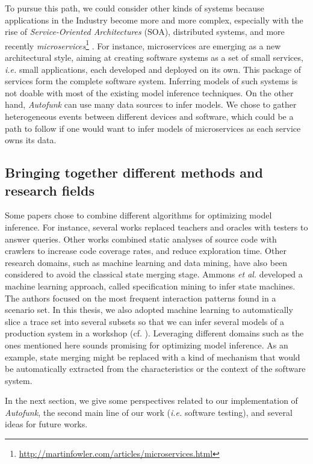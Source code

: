 To pursue this path, we could consider other kinds of systems
because applications in the Industry become more and
more complex, especially with the rise of \emph{Service-Oriented
Architectures} (SOA), distributed systems, and more recently
\emph{microservices}\footnote{\url{http://martinfowler.com/articles/microservices.html}}
\cite{thones2015microservices}.  For instance, microservices are
emerging as a new architectural style, aiming at creating
software systems as a set of small services, \emph{i.e.} small
applications, each developed and deployed on its own. This
package of services form the complete software system. Inferring
models of such systems is not doable with most of the existing
model inference techniques. On the other hand, \textit{Autofunk}
can use many data sources to infer models. We chose to gather
heterogeneous events between different devices and software,
which could be a path to follow if one would want to infer models
of microservices as each service owns its data.

\subsection{Bringing together different methods and research
fields}

Some papers chose to combine different algorithms for optimizing
model inference. For instance, several works
\cite{Alur:2005:SIS:1047659.1040314,Raffelt:2005:LLA:1081180.1081189,ngll11}
replaced teachers and oracles with testers to answer queries.
Other works \cite{Azim13,WPX13} combined static analyses of
source code with crawlers to increase code coverage rates, and
reduce exploration time. Other  research domains, such as machine
learning and data mining, have also been considered to avoid the
classical state merging stage. Ammons \emph{et al.}
\cite{Ammons:2002:MS:565816.503275} developed a machine learning
approach, called specification mining to infer state machines.
The authors focused on the most frequent interaction patterns
found in a scenario set. In this thesis, we also adopted machine
learning to automatically slice a trace set into several subsets
so that we can infer several models of a production system in a
workshop (cf.
).
Leveraging different domains such as the ones mentioned here
sounds promising for optimizing model inference. As an example,
state merging might be replaced with a kind of mechanism that
would be automatically extracted from the characteristics or the
context of the software system.

In the next section, we give some perspectives related to our
implementation of \emph{Autofunk}, the second main line of our
work (\emph{i.e.} software testing), and several ideas for future
works.
